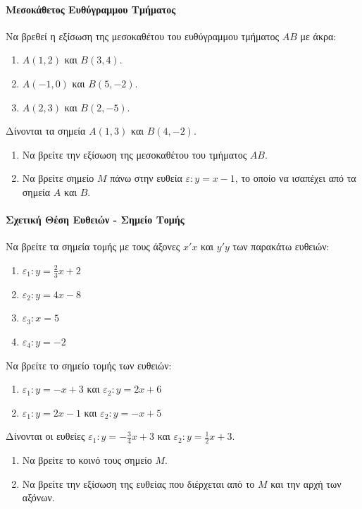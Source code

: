 \documentclass[11pt,a4paper,modern]{FFExercises}
\begin{document}
\paragraph{Μεσοκάθετος Ευθύγραμμου Τμήματος}
\askhsh
Να βρεθεί η εξίσωση της μεσοκαθέτου του ευθύγραμμου τμήματος $ AB $ με άκρα:
\begin{enumerate}[itemsep=0mm,label=\alph*.]
	\item $ A(1,2) $ και $ B(3,4) $.
	\item $ A(-1,0) $ και $ B(5,-2) $.
	\item $ A(2,3) $ και $ B(2,-5) $.
\end{enumerate}

\askhsh
Δίνονται τα σημεία $ A(1,3) $ και $ B(4, -2) $.
\begin{enumerate}[itemsep=0mm,label=\alph*.]
	\item Να βρείτε την εξίσωση της μεσοκαθέτου του τμήματος $ AB $.
	\item Να βρείτε σημείο $ M $ πάνω στην ευθεία $ \varepsilon: y = x - 1 $, το οποίο να ισαπέχει από τα σημεία $ A $ και $ B $.
\end{enumerate}

\paragraph{Σχετική Θέση Ευθειών - Σημείο Τομής}
\askhsh
Να βρείτε τα σημεία τομής με τους άξονες $ x'x $ και $ y'y $ των παρακάτω ευθειών:
\begin{enumerate}[itemsep=0mm,label=\alph*.]
	\item $ \varepsilon_1: y = \frac{2}{3}x + 2 $
	\item $ \varepsilon_2: y = 4x - 8 $
	\item $ \varepsilon_3: x = 5 $
	\item $ \varepsilon_4: y = -2 $
\end{enumerate}

\askhsh
Να βρείτε το σημείο τομής των ευθειών:
\begin{enumerate}[itemsep=0mm,label=\alph*.]
	\item $ \varepsilon_1: y = -x + 3 $ και $ \varepsilon_2: y = 2x + 6 $
	\item $ \varepsilon_1: y = 2x - 1 $ και $ \varepsilon_2: y = -x + 5 $
\end{enumerate}

\askhsh
Δίνονται οι ευθείες $ \varepsilon_1: y = -\frac{3}{4}x + 3 $ και $ \varepsilon_2: y = \frac{1}{2}x + 3 $.
\begin{enumerate}[itemsep=0mm,label=\alph*.]
	\item Να βρείτε το κοινό τους σημείο $ M $.
	\item Να βρείτε την εξίσωση της ευθείας που διέρχεται από το $ M $ και την αρχή των αξόνων.
\end{enumerate}
\end{document}
